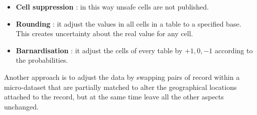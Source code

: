 \begin{itemize}
\item \textbf{Cell suppression} : in this way unsafe cells are not published.
\item \textbf{Rounding} : it adjust the values in all cells in a table to a specified base. This creates uncertainty about the real value for any cell.
\item \textbf{Barnardisation} : it adjust the cells of every table by $+1, 0, -1$ according to the probabilities.
\end{itemize}
Another approach is to adjust the data by swapping pairs of record within a micro-dataset that are partially matched to alter the geographical locations attached to the record, but at the same time leave all the other aspects unchanged.